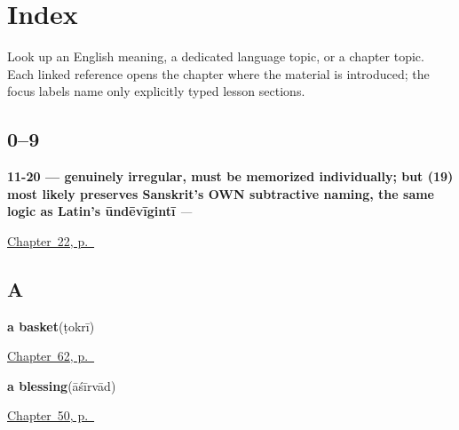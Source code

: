 
\chapter*{Index}

Look up an English meaning, a dedicated language topic, or a chapter topic. Each linked reference opens the chapter where the material is introduced; the focus labels name only explicitly typed lesson sections.

\section*{0--9}

\noindent\begin{minipage}[t]{\linewidth}
\raggedright
\textbf{11-20 — genuinely irregular, must be memorized individually; but  (19) most likely preserves Sanskrit's OWN subtractive naming, the same logic as Latin's ūndēvīgintī}\enspace\emph{ — }\par
\footnotesize \hyperref[ch:hi-numbers-eleven-to-twenty]{Chapter~22, p.~\pageref*{ch:hi-numbers-eleven-to-twenty}}
\end{minipage}\par\smallskip

\section*{A}

\noindent\begin{minipage}[t]{\linewidth}
\raggedright
\textbf{a basket}\enspace\emph{}\enspace(ṭokrī)\par
\footnotesize \hyperref[ch:hi-what-hands-work-with]{Chapter~62, p.~\pageref*{ch:hi-what-hands-work-with}}
\end{minipage}\par\smallskip

\noindent\begin{minipage}[t]{\linewidth}
\raggedright
\textbf{a blessing}\enspace\emph{}\enspace(āśīrvād)\par
\footnotesize \hyperref[ch:hi-courtesy]{Chapter~50, p.~\pageref*{ch:hi-courtesy}}
\end{minipage}\par\smallskip

